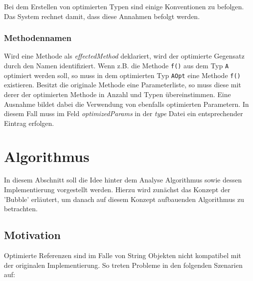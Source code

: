 Bei dem Erstellen von optimierten Typen sind einige Konventionen zu befolgen. Das 
System rechnet damit, dass diese Annahmen befolgt werden. 

\subsubsection{Methodennamen}

Wird eine Methode als \textit{effectedMethod} deklariert, wird der optimierte Gegensatz
durch den Namen identifiziert. Wenn z.B. die Methode \texttt{f()} aus dem Typ \texttt{A}
optimiert werden soll, so muss in dem optimierten Typ \texttt{AOpt} eine Methode
\texttt{f()} existieren. Besitzt die originale Methode eine Parameterliste, so muss
diese mit derer der optimierten Methode in Anzahl und Typen übereinstimmen. Eine Ausnahme
bildet dabei die Verwendung von ebenfalls optimierten Parametern. In diesem Fall muss im Feld 
\textit{optimizedParams} in der \textit{type} Datei ein entsprechender Eintrag erfolgen.


\section{Algorithmus}

In diesem Abschnitt soll die Idee hinter dem Analyse Algorithmus sowie dessen
Implementierung vorgestellt werden. Hierzu wird zunächst das Konzept der 'Bubble'
erläutert, um danach auf diesem Konzept aufbauenden Algorithmus zu betrachten.

\subsection{Motivation}

Optimierte Referenzen sind im Falle von String Objekten nicht kompatibel mit der 
originalen Implementierung. So treten Probleme in den folgenden Szenarien auf:

